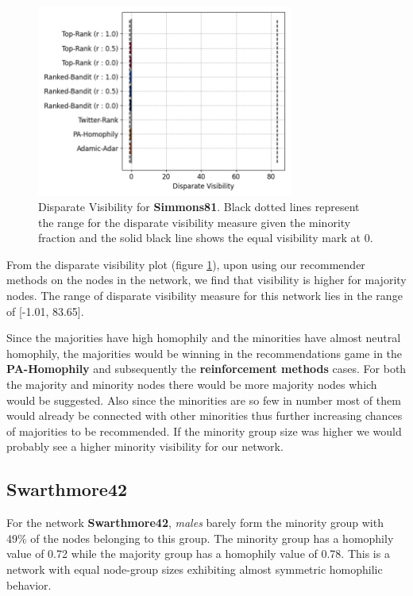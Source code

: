 \begin{figure}
	\centering
	\includegraphics[trim=0 10 0 10, clip, width=0.75\textwidth]{images/dv_simmons.png}
	\caption{Disparate Visibility for \textbf{Simmons81}. Black dotted lines represent the range for the disparate visibility measure given the minority fraction and the solid black line shows the equal visibility mark at 0.}
	\label{dv_simmons}
\end{figure}

From the disparate visibility plot (figure \ref{dv_simmons}), upon using our recommender methods on the nodes in the network, we find that visibility is higher for majority nodes. The range of disparate visibility measure for this network lies in the range of [-1.01, 83.65].

Since the majorities have high homophily and the minorities have almost neutral homophily, the majorities would be winning in the recommendations game in the \textbf{PA-Homophily} and subsequently the \textbf{reinforcement methods} cases. For both the majority and minority nodes there would be more majority nodes which would be suggested. Also since the minorities are so few in number most of them would already be connected with other minorities thus further increasing chances of majorities to be recommended. If the minority group size was higher we would probably see a higher minority visibility for our network. 

\subsection{Swarthmore42}

For the network \textbf{Swarthmore42}, \textit{males} barely form the minority group with 49\% of the nodes belonging to this group. The minority group has a homophily value of 0.72 while the majority group has a homophily value of 0.78. This is a network with equal node-group sizes exhibiting almost symmetric homophilic behavior.

